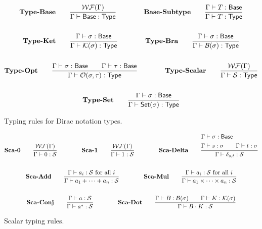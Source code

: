 \documentclass{article}
\begin{document}
\begin{figure}[h]
    \begin{gather*}
        \textbf{Type-Base} \qquad
        \frac{\mathcal{WF}(\Gamma)}{\Gamma \vdash \mathsf{Base} : \mathsf{Type}} 
        \qquad \qquad
        \textbf{Base-Subtype} \qquad
        \frac{\Gamma \vdash T : \mathsf{Base}}{\Gamma \vdash T : \mathsf{Type}} \\
        \\
        \textbf{Type-Ket} \qquad
        \frac{\Gamma \vdash \sigma : \mathsf{Base}}{\Gamma \vdash \mathcal{K}(\sigma) : \mathsf{Type}}
        \qquad \qquad
        \textbf{Type-Bra} \qquad
        \frac{\Gamma \vdash \sigma : \mathsf{Base}}{\Gamma \vdash \mathcal{B}(\sigma) : \mathsf{Type}} \\
        \\
        \textbf{Type-Opt} \qquad
        \frac{\Gamma \vdash \sigma : \mathsf{Base} \qquad \Gamma \vdash \tau : \mathsf{Base}}{\Gamma \vdash \mathcal{O}(\sigma, \tau) : \mathsf{Type}}
        \qquad \qquad
        \textbf{Type-Scalar} \qquad
        \frac{\mathcal{WF}(\Gamma)}{\Gamma \vdash \mathcal{S} : \mathsf{Type}} \\
        \\
        \textbf{Type-Set} \qquad
        \frac{\Gamma \vdash \sigma : \mathsf{Base}}{\Gamma \vdash \mathsf{Set}(\sigma) : \mathsf{Type}}
    \end{gather*}
    \caption{Typing rules for Dirac notation types.}
\end{figure}

\begin{figure}[h]
    \begin{gather*}
        \textbf{Sca-0} \qquad
        \frac{\mathcal{WF}(\Gamma)}{\Gamma \vdash 0 : \mathcal{S}}
        \qquad \qquad
        \textbf{Sca-1} \qquad
        \frac{\mathcal{WF}(\Gamma)}{\Gamma \vdash 1 : \mathcal{S}}
        \qquad \qquad
        \textbf{Sca-Delta} \qquad
        \frac{            
            \begin{aligned}
                & \Gamma\vdash \sigma : \mathsf{Base} \\
                & \Gamma\vdash s : \sigma \qquad \Gamma\vdash t : \sigma
            \end{aligned}} {\Gamma \vdash \delta_{s, t} : \mathcal{S}} \\
        \\
        \textbf{Sca-Add} \qquad
        \frac{\Gamma\vdash a_i : \mathcal{S} \text{ for all $i$}}{\Gamma\vdash a_1 + \cdots + a_n : \mathcal{S}}
        \qquad \qquad
        \textbf{Sca-Mul} \qquad
        \frac{\Gamma\vdash a_i : \mathcal{S} \text{ for all $i$}}{\Gamma\vdash a_1 \times \cdots \times a_n : \mathcal{S}} \\
        \\
        \textbf{Sca-Conj} \qquad
        \frac{\Gamma \vdash a : \mathcal{S}}{\Gamma \vdash a^*:\mathcal{S}}
        \qquad \qquad
        \textbf{Sca-Dot} \qquad
        \frac{\Gamma\vdash B : \mathcal{B}(\sigma) \qquad \Gamma\vdash K : \mathcal{K}(\sigma)}{\Gamma \vdash B \cdot K : \mathcal{S}}
    \end{gather*}
    \caption{Scalar typing rules.}
\end{figure}
\end{document}
